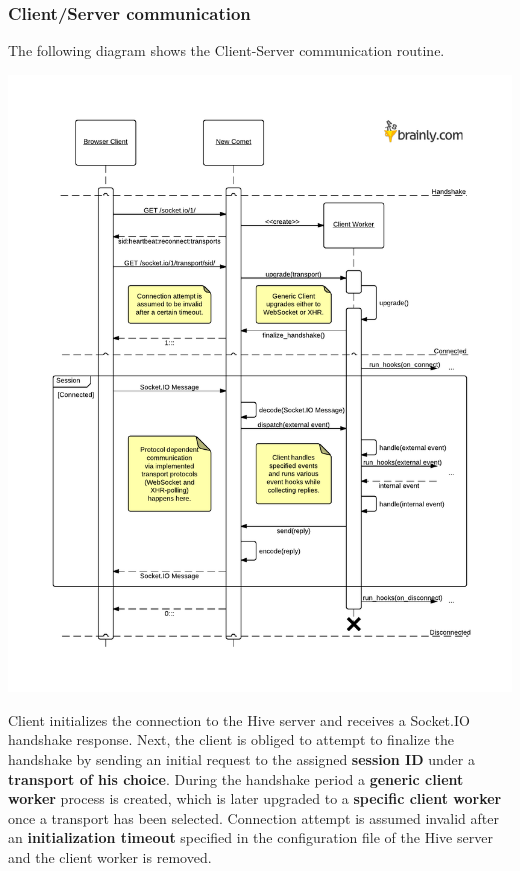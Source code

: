 \documentclass[a4paper]{article}
\begin{document}
\subsubsection{Client/Server communication}
\label{sec-7-1-1}

The following diagram shows the Client-Server communication routine.

\begin{center}
\includegraphics[scale=0.8]{./img/client_server.pdf}
\end{center}

\noindent
Client initializes the connection to the Hive server and receives a Socket.IO handshake response. Next, the client is obliged to attempt to finalize the handshake by sending an initial request to the assigned \textbf{session ID} under a \textbf{transport of his choice}. During the handshake period a \textbf{generic client worker} process is created, which is later upgraded to a \textbf{specific client worker} once a transport has been selected. Connection attempt is assumed invalid after an \textbf{initialization timeout} specified in the configuration file of the Hive server and the client worker is removed.
\end{document}
